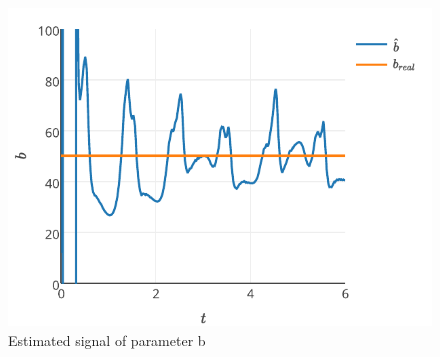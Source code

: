 \documentclass[journal]{IEEEtran}
\begin{document}
\begin{figure}[!t]
    \centering
    \includegraphics[width=\textwidth]{parametrob}
    \caption{Estimated signal of parameter b}
    \label{fig_parametrob}
\end{figure}

%
%

\end{document}
